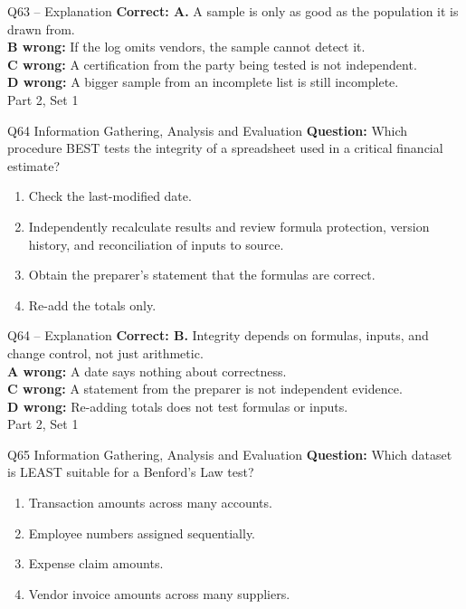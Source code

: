 \documentclass[aspectratio=169,10pt]{beamer}
\begin{document}
\begin{frame}[t]{Q63 -- Explanation}
	\footnotesize
	\textbf{Correct: A.} A sample is only as good as the population it is drawn from. \\[5pt]
\textbf{B wrong:} If the log omits vendors, the sample cannot detect it. \\[3pt]
\textbf{C wrong:} A certification from the party being tested is not independent. \\[3pt]
\textbf{D wrong:} A bigger sample from an incomplete list is still incomplete. \\[3pt]
	\vfill {\tiny Part 2, Set 1}
\end{frame}
\begin{frame}[t]{Q64 \hfill {\scriptsize Information Gathering, Analysis and Evaluation}}
	\small
	\textbf{Question:} Which procedure BEST tests the integrity of a spreadsheet used in a critical financial estimate?
	\begin{enumerate}[label=\Alph*.,itemsep=1pt,topsep=3pt]
			\item Check the last-modified date.
			\item Independently recalculate results and review formula protection, version history, and reconciliation of inputs to source.
			\item Obtain the preparer's statement that the formulas are correct.
			\item Re-add the totals only.
	\end{enumerate}
\end{frame}
\begin{frame}[t]{Q64 -- Explanation}
	\footnotesize
	\textbf{Correct: B.} Integrity depends on formulas, inputs, and change control, not just arithmetic. \\[5pt]
\textbf{A wrong:} A date says nothing about correctness. \\[3pt]
\textbf{C wrong:} A statement from the preparer is not independent evidence. \\[3pt]
\textbf{D wrong:} Re-adding totals does not test formulas or inputs. \\[3pt]
	\vfill {\tiny Part 2, Set 1}
\end{frame}
\begin{frame}[t]{Q65 \hfill {\scriptsize Information Gathering, Analysis and Evaluation}}
	\small
	\textbf{Question:} Which dataset is LEAST suitable for a Benford's Law test?
	\begin{enumerate}[label=\Alph*.,itemsep=1pt,topsep=3pt]
			\item Transaction amounts across many accounts.
			\item Employee numbers assigned sequentially.
			\item Expense claim amounts.
			\item Vendor invoice amounts across many suppliers.
	\end{enumerate}
\end{frame}
\end{document}
